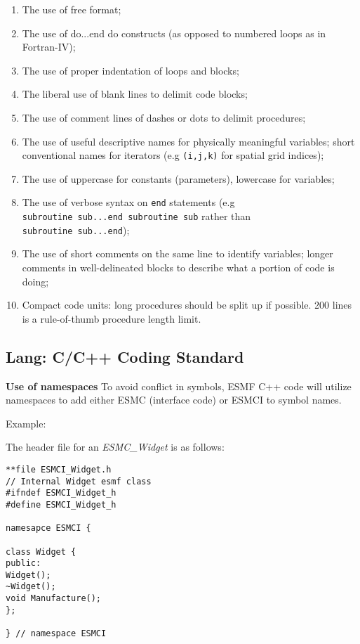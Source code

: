\begin{enumerate}
\item The use of free format;
\item The use of do...end do constructs (as opposed to numbered loops
  as in Fortran-IV);
\item The use of proper indentation of loops and blocks;
\item The liberal use of blank lines to delimit code blocks;
\item The use of comment lines of dashes or dots to delimit
  procedures;
\item The use of useful descriptive names for physically meaningful
  variables; short conventional names for iterators (e.g
  \texttt{(i,j,k)} for spatial grid indices);
\item The use of uppercase for constants (parameters), lowercase for
  variables;
\item The use of verbose syntax on \texttt{end} statements (e.g
  \texttt{subroutine~sub...end~subroutine~sub} rather than
  \texttt{subroutine~sub...end});
\item The use of short comments on the same line to identify
  variables; longer comments in well-delineated blocks to describe
  what a portion of code is doing;
\item Compact code units: long procedures should be split up if
  possible. 200 lines is a rule-of-thumb procedure length limit.
\end{enumerate}

\subsection{Lang: C/C++ Coding Standard}

\item {\bf Use of namespaces}
To avoid conflict in symbols, ESMF C++ code will utilize namespaces to
add either ESMC (interface code) or ESMCI to symbol names.

Example: 

The header file for an {\it ESMC\_Widget} is as follows:
\begin{verbatim}
**file ESMCI_Widget.h
// Internal Widget esmf class
#ifndef ESMCI_Widget_h
#define ESMCI_Widget_h

namesapce ESMCI {

class Widget {
public:
Widget();
~Widget();
void Manufacture();
};

} // namespace ESMCI
\end{verbatim}


